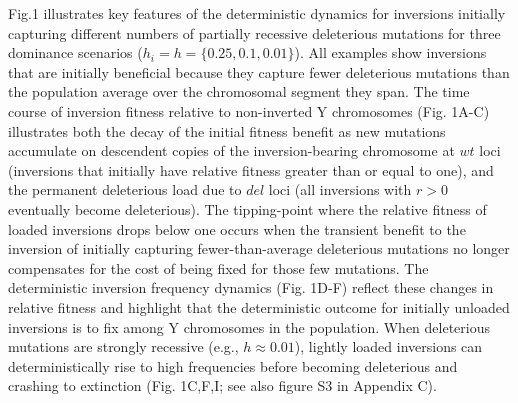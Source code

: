 \documentclass[11pt]{article}
\begin{document}
Fig.1 illustrates key features of the deterministic dynamics for inversions initially capturing different numbers of partially recessive deleterious mutations for three dominance scenarios  ($h_i = h = \{0.25, 0.1, 0.01\}$). All examples show inversions that are initially beneficial because they capture fewer deleterious mutations than the population average over the chromosomal segment they span. The time course of inversion fitness relative to non-inverted Y chromosomes (Fig. 1A-C) illustrates both the decay of the initial fitness benefit as new mutations accumulate on descendent copies of the inversion-bearing chromosome at $wt$ loci (inversions that initially have relative fitness greater than or equal to one), and the permanent deleterious load due to $del$ loci (all inversions with $r > 0$ eventually become deleterious). The tipping-point where the relative fitness of loaded inversions drops below one occurs when the transient benefit to the inversion of initially capturing fewer-than-average deleterious mutations no longer compensates for the cost of being fixed for those few mutations. The deterministic inversion frequency dynamics (Fig. 1D-F) reflect these changes in relative fitness and highlight that the deterministic outcome for initially unloaded inversions is to fix among Y chromosomes in the population. When deleterious mutations are strongly recessive (e.g., $h \approx 0.01$), lightly loaded inversions can deterministically rise to high frequencies before becoming deleterious and crashing to extinction (Fig. 1C,F,I; see also figure S3 in Appendix C). 
\end{document}
